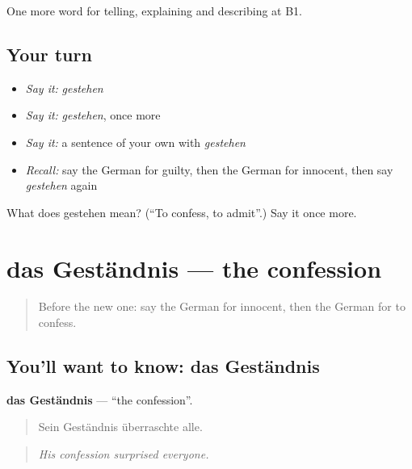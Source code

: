 \begin{grammarlens}[title={What you've built}]
One more word for telling, explaining and describing at B1.
\end{grammarlens}

\subsection*{Your turn}
\begin{itemize}
\raggedright
  \item \emph{Say it:} \emph{gestehen}
  \item \emph{Say it:} \emph{gestehen}, once more
  \item \emph{Say it:} a sentence of your own with \emph{gestehen}
  \item \emph{Recall:} say the German for guilty, then the German for innocent, then say \emph{gestehen} again
\end{itemize}

\begin{tcolorbox}[breakable,colback=teal!4,colframe=teal!35!black,title={Before you move on}]
What does gestehen mean? (\textquotedblleft{}To confess, to admit\textquotedblright{}.) Say it once more.
\end{tcolorbox}
\section[das Geständnis]{das Geständnis — the confession}

\label{lesson:GE-C287-gestaendnis}



\begin{quote}
Before the new one: say the German for innocent, then the German for to confess.
\end{quote}

\subsection*{You'll want to know: das Geständnis}
\textbf{das Geständnis} — \textquotedblleft{}the confession\textquotedblright{}.

\begin{quote}
Sein Geständnis überraschte alle.
\end{quote}

\begin{quote}
\emph{His confession surprised everyone.}
\end{quote}

